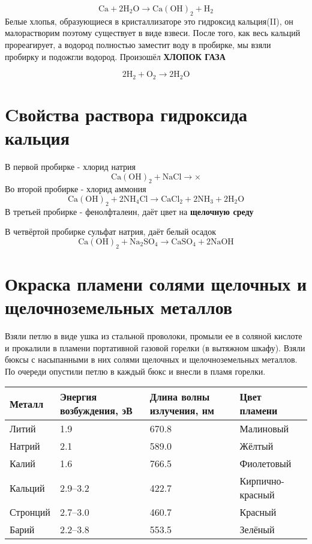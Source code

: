 \documentclass[a4paper,12pt]{article}
\begin{document}
\begin{equation} 
\mathrm{Ca + 2H_2O \longrightarrow Ca(OH)_2 + H_2 } 
\end{equation}
Белые хлопья,
образующиеся в кристаллизаторе это гидроксид кальция(II), он малорастворим поэтому существует в виде взвеси. После того, как весь кальций прореагирует, а водород полностью заместит воду в пробирке, мы взяли пробирку и подожгли водород. Произошёл \textbf{ХЛОПОК ГАЗА}

\begin{equation} 
\mathrm{2H_2 + O_2 \longrightarrow 2H_2O } 
\end{equation}
\section{Cвойства раствора гидроксида кальция}
В первой пробирке - хлорид натрия
\begin{equation} 
\mathrm{Ca(OH)_2 + NaCl \longrightarrow \times } 
\end{equation}
Во второй пробирке - хлорид аммония
\begin{equation} 
\mathrm{Ca(OH)_2 + 2NH_4Cl \longrightarrow CaCl_2 + 2NH_3 + 2H_2O } 
\end{equation}
В третьей пробирке - фенолфталеин, даёт цвет на \textbf{щелочную среду}


В четвёртой пробирке сульфат натрия, даёт белый осадок
\begin{equation} 
\mathrm{Ca(OH)_2 + Na_2SO_4 \longrightarrow CaSO_4 + 2NaOH } 
\end{equation}
\section{Окраска пламени солями щелочных и щелочноземельных металлов}
Взяли петлю в виде ушка из стальной проволоки, промыли ее в соляной кислоте и
прокалили в пламени портативной газовой горелки (в вытяжном шкафу). Взяли бюксы с
насыпанными в них солями щелочных и щелочноземельных металлов. По очереди опустили
петлю в каждый бюкс и внесли в пламя горелки.
\begin{table}[!ht]
    \centering
    \begin{tabular}{|l|l|l|l|}
    \hline
        Металл & Энергия возбуждения, эВ & Длина волны излучения, нм &  Цвет пламени\\ \hline
        Литий & 1.9 & 670.8&   Малиновый \\ \hline
        Натрий & 2.1 & 589.0&  Жёлтый \\ \hline
        Калий & 1.6 & 766.5& Фиолетовый\\ \hline
        Кальций & 2.9–3.2 & 422.7& Кирпично-красный \\ \hline
        Стронций & 2.7–3.0 & 460.7& Красный \\ \hline
        Барий & 2.2–3.8 & 553.5& Зелёный \\ \hline
    \end{tabular}
\end{table}
\end{document}
